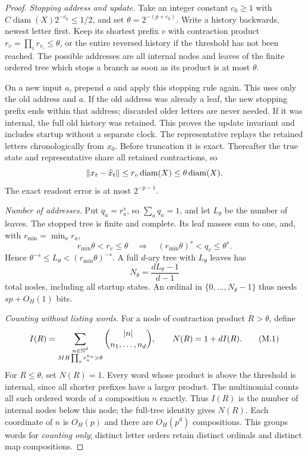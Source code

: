 \begin{proof}
\emph{Stopping address and update.}
Take an integer constant $c_0\ge1$ with $C\operatorname{diam}(X)2^{-c_0}
\le1/2$, and set $\theta=2^{-(p+c_0)}$. Write a history backwards, newest
letter first. Keep its shortest prefix $v$ with contraction product
$r_v=\prod_i r_{v_i}\le\theta$, or the entire reversed history if the
threshold has not been reached. The possible addresses are all internal nodes
and leaves of the finite ordered tree which stops a branch as soon as its
product is at most $\theta$.

On a new input $a$, prepend $a$ and apply this stopping rule again.
This uses only the old address and $a$. If the old address was already a leaf,
the new stopping prefix ends within that address; discarded older letters
are never needed. If it was internal, the full old history was retained.
This proves the update invariant and includes startup without a separate clock.
The representative replays the retained letters chronologically from $x_0$.
Before truncation it is exact. Thereafter the true state and representative
share all retained contractions, so
\[
 \left\lVert x_t-\widehat x_t\right\rVert\le r_v\operatorname{diam}(X)
 \le\theta\operatorname{diam}(X).
\]
The exact readout error is at most $2^{-p-1}$.

\emph{Number of addresses.}
Put $q_a=r_a^s$, so $\sum_a q_a=1$, and let $L_\theta$ be the number of
leaves. The stopped tree is finite and complete. Its leaf masses sum to one,
and, with $r_{\min}=\min_a r_a$,
\[
 r_{\min}\theta<r_v\le\theta
 \quad\Longrightarrow\quad
 (r_{\min}\theta)^s<q_v\le\theta^s.
\]
Hence $\theta^{-s}\le L_\theta<(r_{\min}\theta)^{-s}$. A full $d$-ary
tree with $L_\theta$ leaves has
\[
 N_\theta=\frac{dL_\theta-1}{d-1}
\]
total nodes, including all startup states. An ordinal in
$\{0,\ldots,N_\theta-1\}$ thus needs $sp+O_H(1)$ bits.

\emph{Counting without listing words.}
For a node of contraction product $R>\theta$, define
\[
 I(R)=\sum_{\substack{n\in\mathbb N^d\\MR\prod_a r_a^{n_a}>\theta}}
       \binom{|n|}{n_1,\ldots,n_d},
 \qquad N(R)=1+dI(R).
 \tag{M.1}
\]
For $R\le\theta$, set $N(R)=1$. Every word whose product is above the
threshold is internal, since all shorter prefixes have a larger product.
The multinomial counts all such ordered words of a composition $n$ exactly.
Thus $I(R)$ is the number of internal nodes below this node; the full-tree
identity gives $N(R)$. Each coordinate of $n$ is $O_H(p)$ and there are
$O_H(p^d)$ compositions. This groups words for \emph{counting only}; distinct
letter orders retain distinct ordinals and distinct map compositions.


\end{proof}
